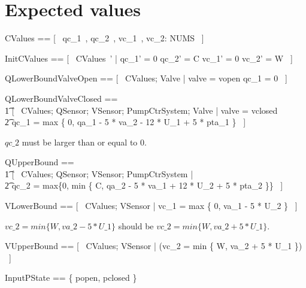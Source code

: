 \documentclass{report} %
\begin{document}
\section{Expected values}
\begin{zed}
  CValues == [~ qc\_1~, qc\_2~, vc\_1~, vc\_2: NUMS ~]
\end{zed}

\begin{zed}
  InitCValues == [~ CValues~' | qc\_1' = 0 \land qc\_2' = C \land vc\_1' = 0 \land vc\_2' = W ~]
\end{zed}

\begin{zed}
  QLowerBoundValveOpen == [~ CValues; Valve | valve = vopen \land qc\_1 = 0 ~]
\end{zed}

\begin{zed}
  QLowerBoundValveClosed ==
  \\ %
  \t1 [~ CValues; QSensor; VSensor; PumpCtrSystem; Valve | valve = vclosed \land \\
     \t2 qc\_1 = max \{ 0, qa\_1 - 5 * va\_2 - 12 * U\_1 + 5 * pta\_1 \} ~]
\end{zed}

$qc\_2$ must be larger than or equal to 0.
\begin{zed}
  QUpperBound ==
  \\ %
  \t1 [~ CValues; QSensor; VSensor; PumpCtrSystem | \\ %
    \t2 qc\_2 = max\{0, min \{ C, qa\_2 - 5 * va\_1 + 12 * U\_2 + 5 * pta\_2 \}\} ~]
\end{zed}

\begin{zed}
  VLowerBound == [~ CValues; VSensor | vc\_1 = max \{ 0, va\_1 - 5 * U\_2 \} ~]
\end{zed}

$vc\_2 = min \{ W, va\_2 - 5 * U\_1 \}$ should be $vc\_2 = min \{ W, va\_2 + 5 * U\_1 \}$. 
\begin{zed}
  VUpperBound == [~ CValues; VSensor | (vc\_2 = min \{ W, va\_2 + 5 * U\_1 \}) ~]
\end{zed}

\begin{zed}
  InputPState == \{ popen, pclosed \}
\end{zed}
\end{document}
